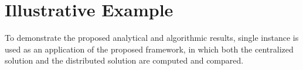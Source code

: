 \documentclass[conference]{IEEEtran}
\begin{document}

\section{Illustrative Example \label{sec:examples}}

To demonstrate the proposed analytical and algorithmic results, single instance is used as an application of the proposed framework, in which both the centralized solution and the distributed solution are computed and compared.
\end{document}

